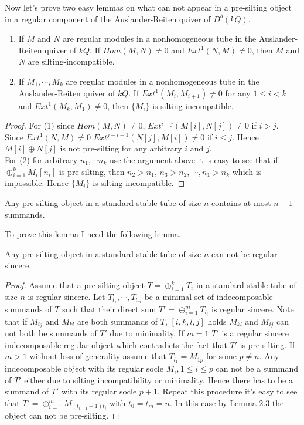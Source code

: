 \indent Now let's prove two easy lemmas on what can not appear in a pre-silting object in a regular component of the Auslander-Reiten quiver of $D^b(kQ)$.\\
\begin{lemma}
\begin{enumerate}
\item If $M$ and $N$ are regular modules in a nonhomogeneous tube in the Auslander-Reiten quiver of $kQ$. If $Hom(M,N)\neq 0$ and $Ext^1(N,M)\neq 0$, then $M$ and $N$ are silting-incompatible.\\
\item If $M_1,\cdots, M_k$ are regular modules in a nonhomogeneous tube in the Auslander-Reiten quiver of $kQ$. If $Ext^1(M_i,M_{i+1})\neq 0$ for any $1\leq i<k$  and $Ext^1(M_k,M_1)\neq 0$, then $\{M_i\}$  is silting-incompatible.\\
\end{enumerate}
\end{lemma}
\begin{proof}
\indent For (1) since $Hom(M,N)\neq 0$, $Ext^{i-j}(M[i],N[j])\neq 0$ if $i>j$. Since $Ext^1(N,M)\neq 0$ $Ext^{j-i+1}(N[j],M[i])\neq 0$ if $i\leq j$. Hence $M[i]\oplus N[j]$ is not pre-silting for any arbitrary $i$ and $j$.\\
\indent For (2) for arbitrary $n_1,\cdots n_k$ use the argument above it is easy to see that if $\oplus_{i=1}^kM_i[n_i]$ is pre-silting, then $n_2>n_1$, $n_3>n_2$, $\cdots, n_1>n_k$ which is impossible. Hence $\{M_i\}$  is silting-incompatible.
\end{proof}
\begin{lemma}\label{def:C3L3}
Any pre-silting object in a standard stable tube of size $n$ contains at most $n-1$ summands.
\end{lemma}
\indent To prove this lemma I need the following lemma.
\begin{lemma}
Any pre-silting object in a standard stable tube of size $n$ can not be regular sincere.
\end{lemma}
\begin{proof}
\indent Assume that a pre-silting object $T=\oplus_{i=1}^k T_i$ in a standard stable tube of size $n$ is regular sincere. Let $T_{l_1},\cdots, T_{l_m}$ be a minimal set of indecomposable summands of $T$ such that their direct sum $T'=\oplus_{i=1}^m T_{l_i}$ is regular sincere. Note that if $M_{ij}$ and $M_{kl}$ are both summands of $T$, $[i,k,l,j]$ holds $M_{kl}$ and $M_{ij}$ can not both be summands of $T'$ due to minimality. If $m=1$ $T'$ is a regular sincere indecomposable regular object which contradicts the fact that $T'$ is pre-silting. If $m>1$ without loss of generality assume that $T_{l_1}=M_{1p}$ for some $p\neq n$. Any indecomposable object with its regular socle $M_i, 1\leq i\leq p$ can not be a summand of $T'$ either due to silting incompatibility or minimality. Hence there has to be a summand of $T'$ with its regular socle $p+1$. Repeat this procedure it's easy to see that $T'=\oplus_{i=1}^m M_{(t_{i-1}+1)t_i}$ with $t_0=t_m=n$. In this case by Lemma 2.3 the object can not be pre-silting.
\end{proof}
